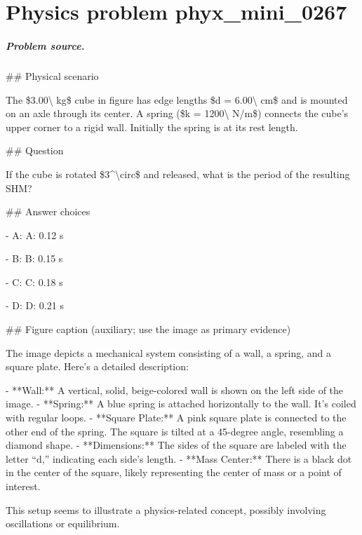 
\chapter{Physics problem phyx\_mini\_0267}
\label{ch:PhyXMiniProblems_problem_phyx_mini_0267}

\paragraph{Problem source.}
\#\# Physical scenario

The \$3.00\textbackslash{} kg\$ cube in figure has edge lengths \$d = 6.00\textbackslash{} cm\$ and is mounted on an axle through its center. A spring (\$k = 1200\textbackslash{} N/m\$) connects the cube's upper corner to a rigid wall. Initially the spring is at its rest length.

\#\# Question

If the cube is rotated \$3\textasciicircum{}\textbackslash{}circ\$ and released, what is the period of the resulting SHM?

\#\# Answer choices

- A: A: 0.12 s

- B: B: 0.15 s

- C: C: 0.18 s

- D: D: 0.21 s

\#\# Figure caption (auxiliary; use the image as primary evidence)

The image depicts a mechanical system consisting of a wall, a spring, and a square plate. Here's a detailed description:

- **Wall:** A vertical, solid, beige-colored wall is shown on the left side of the image.
- **Spring:** A blue spring is attached horizontally to the wall. It's coiled with regular loops.
- **Square Plate:** A pink square plate is connected to the other end of the spring. The square is tilted at a 45-degree angle, resembling a diamond shape.
- **Dimensions:** The sides of the square are labeled with the letter “d,” indicating each side's length.
- **Mass Center:** There is a black dot in the center of the square, likely representing the center of mass or a point of interest. 

This setup seems to illustrate a physics-related concept, possibly involving oscillations or equilibrium.

